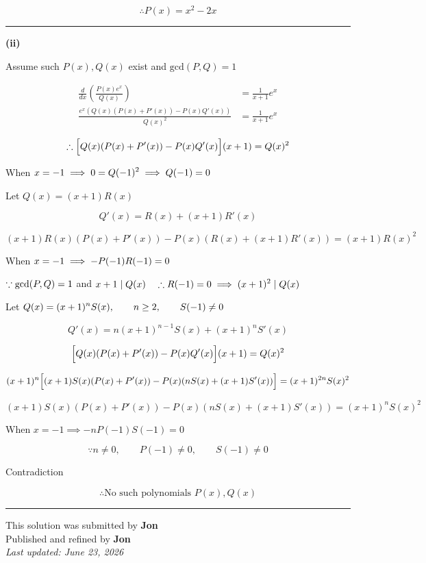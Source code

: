 \documentclass[12pt]{article}
\begin{document}
$$\therefore \boxed{P(x)=x^2-2x}$$

\bigskip\hrule\bigskip

\textbf{(ii)}

Assume such $P(x),Q(x)$ exist and $\text{gcd}(P,Q)=1$

\begin{align*}
\frac{d}{dx}\left(\frac{P(x)e^x}{Q(x)}\right)&=\frac1{x+1}e^x\\
\frac{e^x\left(Q(x)(P(x)+P'(x))-P(x)Q'(x)\right)}{Q(x)^2}&=\frac1{x+1}e^x
\end{align*}

$$\therefore \Bigl[Q(x)(P(x)+P'(x))-P(x)Q'(x)\Bigr](x+1)=Q(x)^2$$

When $\displaystyle x=-1\implies0=Q(-1)^2\implies Q(-1)=0$

Let $Q(x)=(x+1)R(x)$

$$Q'(x)=R(x)+(x+1)R'(x)$$

$$
(x+1)R(x)(P(x)+P'(x))-P(x)(R(x)+(x+1)R'(x))=(x+1)R(x)^2
$$

When $\displaystyle x=-1\implies -P(-1)R(-1)=0$

$\because \displaystyle \text{gcd}(P,Q)=1$ and $x+1\mid Q(x) \quad \therefore \displaystyle R(-1)=0 \implies (x+1)^2\mid Q(x)$

Let $\displaystyle Q(x)=(x+1)^nS(x),\qquad n\geq2,\qquad S(-1)\neq0$

$$Q'(x)=n(x+1)^{n-1}S(x)+(x+1)^nS'(x)$$

$$\Bigl[Q(x)(P(x)+P'(x))-P(x)Q'(x)\Bigr](x+1)=Q(x)^2$$

$$
(x+1)^n\Bigl[(x+1)S(x)(P(x)+P'(x))-P(x)(nS(x)+(x+1)S'(x))\Bigr]=(x+1)^{2n}S(x)^2
$$

$$(x+1)S(x)(P(x)+P'(x))-P(x)(nS(x)+(x+1)S'(x))=(x+1)^nS(x)^2$$

When $x=-1\implies -nP(-1)S(-1)=0$

$$\because n\neq0,\qquad P(-1)\neq0,\qquad S(-1)\neq0$$

Contradiction

$$\therefore \boxed{\text{No such polynomials }P(x),Q(x)}$$

\bigskip
\hrule
\begin{center}
    This solution was submitted by \textbf{Jon}\\[4pt]
    Published and refined by \textbf{Jon}\\[8pt]
    \textit{Last updated: June 23, 2026}
\end{center}
\end{document}
